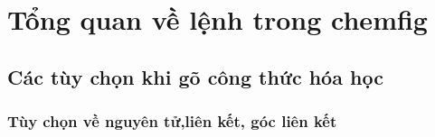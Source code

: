 \documentclass[Main.tex]{subfiles}
\begin{document}
\setcounter{secnumdepth}{4}
\titlespacing*{\subsubsection}{0cm}{0pt}{0pt}
\chapter{Tổng quan về lệnh trong chemfig}
\section{Các tùy chọn khi gõ công thức hóa học}
\subsection{Tùy chọn về nguyên tử,liên kết, góc liên kết}
\end{document}
